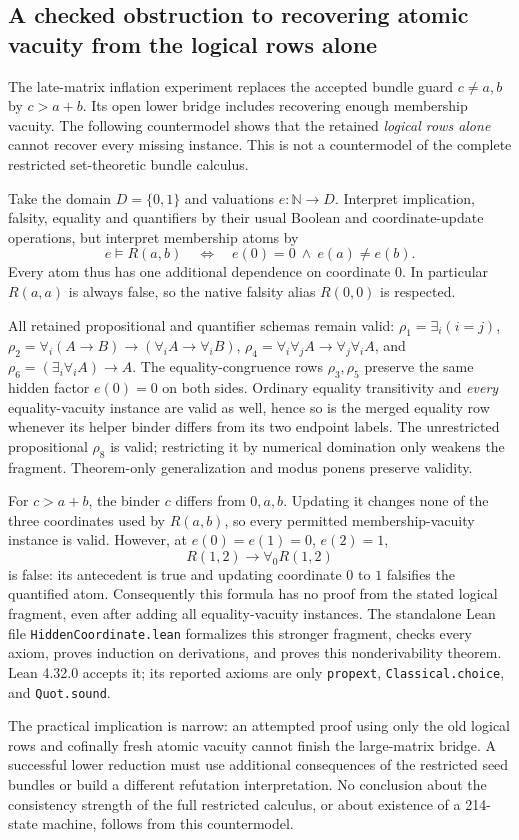 \subsection{A checked obstruction to recovering atomic vacuity from the logical rows alone}

The late-matrix inflation experiment replaces the accepted bundle guard
$c\ne a,b$ by $c>a+b$.  Its open lower bridge includes recovering enough
membership vacuity.  The following countermodel shows that the retained
\emph{logical rows alone} cannot recover every missing instance.  This is
not a countermodel of the complete restricted set-theoretic bundle calculus.

Take the domain $D=\{0,1\}$ and valuations $e:\mathbb N\to D$.  Interpret
implication, falsity, equality and quantifiers by their usual Boolean and
coordinate-update operations, but interpret membership atoms by
\[
             e\models R(a,b)
       \quad\Longleftrightarrow\quad e(0)=0\ \land\ e(a)\ne e(b).
\]
Every atom thus has one additional dependence on coordinate $0$.  In
particular $R(a,a)$ is always false, so the native falsity alias $R(0,0)$
is respected.

All retained propositional and quantifier schemas remain valid:
$\rho_1=\exists_i(i=j)$,
$\rho_2=\forall_i(A\to B)\to(\forall_i A\to\forall_i B)$,
$\rho_4=\forall_i\forall_j A\to\forall_j\forall_i A$, and
$\rho_6=(\exists_i\forall_i A)\to A$.
The equality-congruence rows $\rho_3,\rho_5$ preserve the same hidden
factor $e(0)=0$ on both sides.  Ordinary equality transitivity and
\emph{every} equality-vacuity instance are valid as well, hence so is the
merged equality row whenever its helper binder differs from its two
endpoint labels.  The unrestricted propositional $\rho_8$ is valid;
restricting it by numerical domination only weakens the fragment.
Theorem-only generalization and modus ponens preserve validity.

For $c>a+b$, the binder $c$ differs from $0,a,b$.  Updating it changes
none of the three coordinates used by $R(a,b)$, so every permitted
membership-vacuity instance is valid.  However, at
$e(0)=e(1)=0$, $e(2)=1$,
\[
                R(1,2)\longrightarrow\forall_0 R(1,2)
\]
is false: its antecedent is true and updating coordinate $0$ to $1$
falsifies the quantified atom.  Consequently this formula has no proof
from the stated logical fragment, even after adding all equality-vacuity
instances.  The standalone Lean file \texttt{HiddenCoordinate.lean}
formalizes this stronger fragment, checks every axiom, proves induction
on derivations, and proves this nonderivability theorem.  Lean 4.32.0
accepts it; its reported axioms are only \texttt{propext},
\texttt{Classical.choice}, and \texttt{Quot.sound}.

The practical implication is narrow: an attempted proof using only the
old logical rows and cofinally fresh atomic vacuity cannot finish the
large-matrix bridge.  A successful lower reduction must use additional
consequences of the restricted seed bundles or build a different
refutation interpretation.  No conclusion about the consistency strength
of the full restricted calculus, or about existence of a 214-state
machine, follows from this countermodel.

